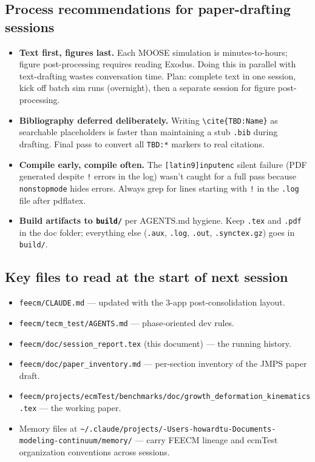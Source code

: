\documentclass[11pt,letterpaper]{article}
\newenvironment{tightitemize}{\begin{itemize}\setlength\itemsep{0pt}\setlength\parsep{0pt}}{\end{itemize}}
\newcommand{\code}[1]{\texttt{\small #1}}
\begin{document}
\subsection{Process recommendations for paper-drafting sessions}

\begin{tightitemize}
  \item \textbf{Text first, figures last.} Each MOOSE simulation is minutes-to-hours; figure post-processing requires reading Exodus. Doing this in parallel with text-drafting wastes conversation time. Plan: complete text in one session, kick off batch sim runs (overnight), then a separate session for figure post-processing.
  \item \textbf{Bibliography deferred deliberately.} Writing \code{\textbackslash{}cite\{TBD:Name\}} as searchable placeholders is faster than maintaining a stub \code{.bib} during drafting. Final pass to convert all \code{TBD:*} markers to real citations.
  \item \textbf{Compile early, compile often.} The \code{[latin9]inputenc} silent failure (PDF generated despite \code{!} errors in the log) wasn't caught for a full pass because \code{nonstopmode} hides errors. Always grep for lines starting with \code{!} in the \code{.log} file after pdflatex.
  \item \textbf{Build artifacts to \code{build/}} per AGENTS.md hygiene. Keep \code{.tex} and \code{.pdf} in the doc folder; everything else (\code{.aux}, \code{.log}, \code{.out}, \code{.synctex.gz}) goes in \code{build/}.
\end{tightitemize}

\subsection{Key files to read at the start of next session}

\begin{tightitemize}
  \item \code{feecm/CLAUDE.md} --- updated with the 3-app post-consolidation layout.
  \item \code{feecm/tecm\_test/AGENTS.md} --- phase-oriented dev rules.
  \item \code{feecm/doc/session\_report.tex} (this document) --- the running history.
  \item \code{feecm/doc/paper\_inventory.md} --- per-section inventory of the JMPS paper draft.
  \item \code{feecm/projects/ecmTest/benchmarks/doc/growth\_deformation\_kinematics.tex} --- the working paper.
  \item Memory files at \code{\textasciitilde{}/.claude/projects/-Users-howardtu-Documents-modeling-continuum/memory/} --- carry FEECM lineage and ecmTest organization conventions across sessions.
\end{tightitemize}
\end{document}
